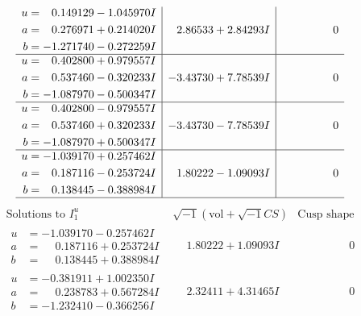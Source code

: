 \documentclass[1p]{elsarticle_modified}
\theoremstyle{definition}
\newcommand{\I}{\sqrt{-1}}
\begin{document}
$$\begin{array}{c|c|c}
\begin{aligned}
u &= \phantom{-}0.149129 - 1.045970 I \\
a &= \phantom{-}0.276971 + 0.214020 I \\
b &= -1.271740 - 0.272259 I\end{aligned}
 & \phantom{-}2.86533 + 2.84293 I & \phantom{-0.000000 } 0 \\ \hline\begin{aligned}
u &= \phantom{-}0.402800 + 0.979557 I \\
a &= \phantom{-}0.537460 - 0.320233 I \\
b &= -1.087970 - 0.500347 I\end{aligned}
 & -3.43730 + 7.78539 I & \phantom{-0.000000 } 0 \\ \hline\begin{aligned}
u &= \phantom{-}0.402800 - 0.979557 I \\
a &= \phantom{-}0.537460 + 0.320233 I \\
b &= -1.087970 + 0.500347 I\end{aligned}
 & -3.43730 - 7.78539 I & \phantom{-0.000000 } 0 \\ \hline\begin{aligned}
u &= -1.039170 + 0.257462 I \\
a &= \phantom{-}0.187116 - 0.253724 I \\
b &= \phantom{-}0.138445 - 0.388984 I\end{aligned}
 & \phantom{-}1.80222 - 1.09093 I & \phantom{-0.000000 } 0\\
 \hline 
 \end{array}$$\newpage$$\begin{array}{c|c|c}  
\text{Solutions to }I^u_{1}& \I (\text{vol} + \sqrt{-1}CS) & \text{Cusp shape}\\
 \hline 
\begin{aligned}
u &= -1.039170 - 0.257462 I \\
a &= \phantom{-}0.187116 + 0.253724 I \\
b &= \phantom{-}0.138445 + 0.388984 I\end{aligned}
 & \phantom{-}1.80222 + 1.09093 I & \phantom{-0.000000 } 0 \\ \hline\begin{aligned}
u &= -0.381911 + 1.002350 I \\
a &= \phantom{-}0.238783 + 0.567284 I \\
b &= -1.232410 - 0.366256 I\end{aligned}
 & \phantom{-}2.32411 + 4.31465 I & \phantom{-0.000000 } 0 \\ \hline\begin{aligned}

\end{aligned}
\end{array}$$
\end{document}
